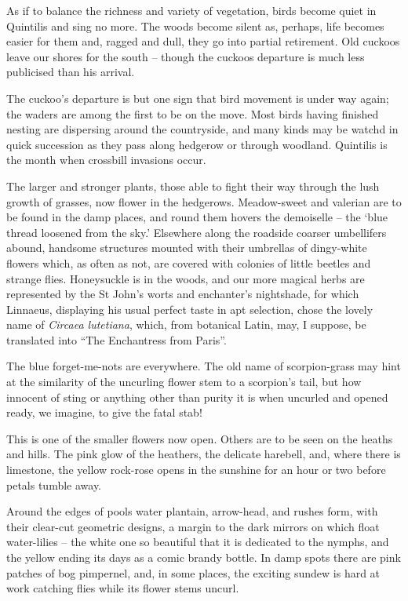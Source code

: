 As if to balance the richness and variety of vegetation, birds become quiet in Quintilis and sing no more. The woods become silent as, perhaps, life becomes easier for them and, ragged and dull, they go into partial retirement. Old cuckoos leave our shores for the south -- though the cuckoos departure is much less publicised than his arrival.

The cuckoo's departure is but one sign that bird movement is under way again; the waders are among the first to be on the move. Most birds having finished nesting are dispersing around the countryside, and many kinds may be watchd in quick succession as they pass along hedgerow or through woodland. Quintilis is the month when crossbill invasions occur.

The larger and stronger plants, those able to fight their way through the lush growth of grasses, now flower in the hedgerows. Meadow-sweet and valerian are to be found in the damp places, and round them hovers the demoiselle -- the `blue thread loosened from the sky.' Elsewhere along the roadside coarser umbellifers abound, handsome structures mounted with their umbrellas of dingy-white flowers which, as often as not, are covered with colonies of little beetles and strange flies. Honeysuckle is in the woods, and our more magical herbs are represented by the St John's worts and enchanter's nightshade, for which Linnaeus, displaying his usual perfect taste in apt selection, chose the lovely name of \emph{Circaea lutetiana}, which, from botanical Latin, may, I suppose, be translated into ``The Enchantress from Paris''.

The blue forget-me-nots are everywhere. The old name of scorpion-grass may hint at the similarity of the uncurling flower stem to a scorpion's tail, but how innocent of sting or anything other than purity it is when uncurled and opened ready, we imagine, to give the fatal stab!

This is one of the smaller flowers now open. Others are to be seen on the heaths and hills. The pink glow of the heathers, the delicate harebell, and, where there is limestone, the yellow rock-rose opens in the sunshine for an hour or two before petals tumble away.

Around the edges of pools water plantain, arrow-head, and rushes form, with their clear-cut geometric designs, a margin to the dark mirrors on which float water-lilies -- the white one so beautiful that it is dedicated to the nymphs, and the yellow ending its days as a comic brandy bottle. In damp spots there are pink patches of bog pimpernel, and, in some places, the exciting sundew is hard at work catching flies while its flower stems uncurl.

